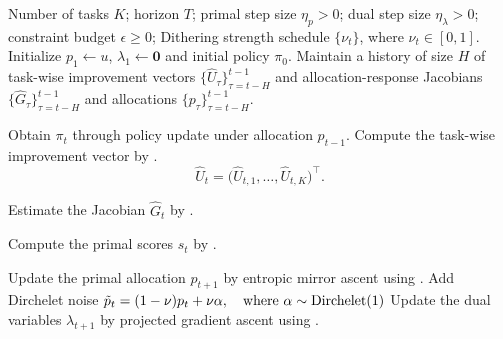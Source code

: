 \begin{algorithm}[t]
\caption{Primal--Dual Mirror Descent with Full Jacobian}
\label{alg:pdcm_jacobian}
\begin{algorithmic}[1]
\REQUIRE
Number of tasks $K$; horizon $T$;
primal step size $\eta_p>0$;
dual step size $\eta_\lambda>0$;
constraint budget $\epsilon\ge 0$;
Dithering strength schedule $\{\nu_t\}$, where $\nu_t \in [0, 1]$.
\STATE Initialize $p_1 \gets u$, $\lambda_1 \gets \mathbf{0}$ and initial policy $\pi_0$.
\STATE Maintain a history of size $H$ of task-wise improvement vectors $\{\widehat U_\tau\}_{\tau=t-H}^{t-1}$ and allocation-response Jacobians $\{\widehat G_\tau\}_{\tau=t-H}^{t-1}$ and allocations $\{p_\tau\}_{\tau=t-H}^{t-1}$.

    \STATE Obtain $\pi_t$ through policy update under allocation $p_{t-1}$. \COMMENT{\textcolor{blue}{RL step.}}
    \STATE Compute the task-wise improvement vector by .
    \[
    \widehat U_t
    =
    \bigl(
    \widehat U_{t,1},\ldots,\widehat U_{t,K}
    \bigr)^\top.
    \]
    \COMMENT{\textcolor{blue}{Extra forward pass with the updated policy.}}

    \STATE Estimate the Jacobian $\widehat G_t$ by . \COMMENT{\textcolor{blue}{Applies Theil-Sen regression to estimate first-order sensitivity.}}

    \STATE Compute the primal scores $s_t$ by .

    \STATE Update the primal allocation $p_{t+1}$ by entropic mirror ascent using .  \COMMENT{\textcolor{blue}{Exponential weight update.}}
    \STATE Add Dirchelet noise $\Tilde{p}_t = (1 - \nu)p_t + \nu\alpha,  \quad \text{where } \alpha \sim \mathrm{Dirchelet}(1)$ \label{alg:dirchlet}
    \STATE Update the dual variables $\lambda_{t+1}$ by projected gradient ascent using .
\ENDFOR
\end{algorithmic}
\end{algorithm}